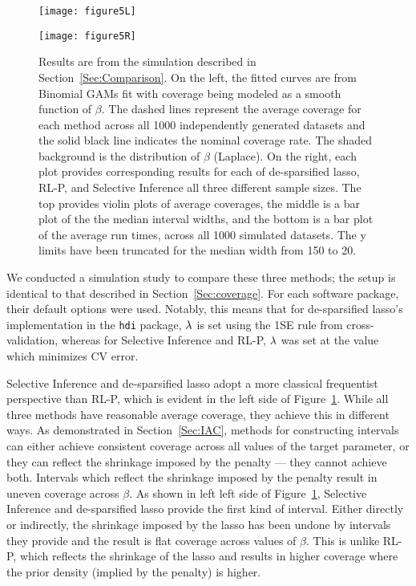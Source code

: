 \begin{figure}[htb!]
  \begin{center}
    \begin{minipage}[t]{0.34\linewidth}
      \centering
      \texttt{[image: figure5L]}
    \end{minipage}
    \hfill
    \begin{minipage}[t]{0.64\linewidth}
      \centering
      \texttt{[image: figure5R]}
    \end{minipage}
    \caption{\label{fig:5} Results are from the simulation described in Section~\ref{Sec:Comparison}. On the left, the fitted curves are from Binomial GAMs fit with coverage being modeled as a smooth function of $\beta$. The dashed lines represent the average coverage for each method across all 1000 independently generated datasets and the solid black line indicates the nominal coverage rate. The shaded background is the distribution of $\beta$ (Laplace). On the right, each plot provides corresponding results for each of de-sparsified lasso, RL-P, and Selective Inference all three different sample sizes. The top provides violin plots of average coverages, the middle is a bar plot of the the median interval widths, and the bottom is a bar plot of the average run times, across all 1000 simulated datasets. The y limits have been truncated for the median width from 150 to 20.}
  \end{center}
\end{figure}

We conducted a simulation study to compare these three methods; the setup is identical to that described in Section~\ref{Sec:coverage}. For each software package, their default options were used. Notably, this means that for de-sparsified lasso's implementation in the \texttt{hdi} package, $\lambda$ is set using the 1SE rule from cross-validation, whereas for Selective Inference and RL-P, $\lambda$ was set at the value which minimizes CV error.

Selective Inference and de-sparsified lasso adopt a more classical frequentist perspective than RL-P, which is evident in the left side of Figure~\ref{fig:5}. While all three methods have reasonable average coverage, they achieve this in different ways. As demonstrated in Section~\ref{Sec:IAC}, methods for constructing intervals can either achieve consistent coverage across all values of the target parameter, or they can reflect the shrinkage imposed by the penalty --- they cannot achieve both. Intervals which reflect the shrinkage imposed by the penalty result in uneven coverage across $\beta$. As shown in left left side of Figure~\ref{fig:5}, Selective Inference and de-sparsified lasso provide the first kind of interval. Either directly or indirectly, the shrinkage imposed by the lasso has been undone by intervals they provide and the result is flat coverage across values of $\beta$. This is unlike RL-P, which reflects the shrinkage of the lasso and results in higher coverage where the prior density (implied by the penalty) is higher.

